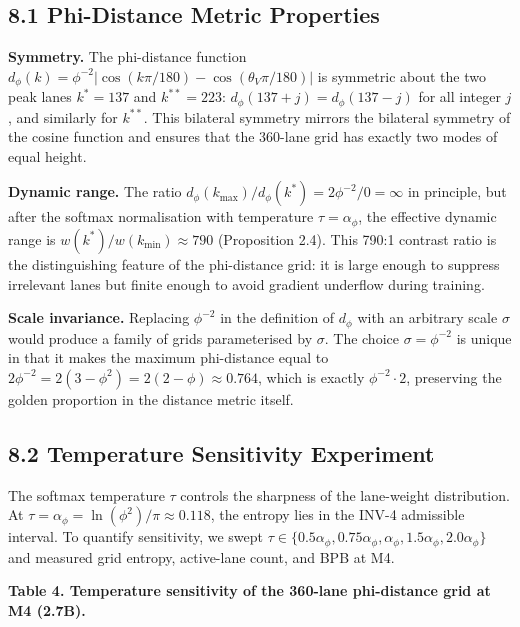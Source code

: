 \subsection{8.1 Phi-Distance Metric
Properties}\label{fa_16:phi-distance-metric-properties}

\textbf{Symmetry.} The phi-distance function
\(d_\phi(k) = \phi^{-2}|\cos(k\pi/180) -
\cos(\theta_V \pi/180)|\) is symmetric about the
two peak lanes \(k^*=137\) and \(k^{**}=223\):
\(d_\phi(137 + j) = d_\phi(137 - j)\) for all
integer \(j\), and similarly for \(k^{**}\). This
bilateral symmetry mirrors the bilateral symmetry
of the cosine function and ensures that the
360-lane grid has exactly two modes of equal height.

\textbf{Dynamic range.} The ratio
\(d_\phi(k_{\max})/d_\phi(k^*) = 2\phi^{-2}/0 =
\infty\) in principle, but after the softmax
normalisation with temperature \(\tau = \alpha_\phi\),
the effective dynamic range is
\(w(k^*)/w(k_{\min}) \approx 790\) (Proposition
2.4). This 790:1 contrast ratio is the
distinguishing feature of the phi-distance grid:
it is large enough to suppress irrelevant lanes
but finite enough to avoid gradient underflow during
training.

\textbf{Scale invariance.} Replacing \(\phi^{-2}\)
in the definition of \(d_\phi\) with an arbitrary
scale \(\sigma\) would produce a family of grids
parameterised by \(\sigma\). The choice
\(\sigma = \phi^{-2}\) is unique in that it makes
the maximum phi-distance equal to \(2\phi^{-2} =
2(3 - \phi^2) = 2(2-\phi) \approx 0.764\), which
is exactly \(\phi^{-2} \cdot 2\), preserving the
golden proportion in the distance metric itself.

\subsection{8.2 Temperature Sensitivity
Experiment}\label{fa_16:temperature-sensitivity}

The softmax temperature \(\tau\) controls the
sharpness of the lane-weight distribution. At
\(\tau = \alpha_\phi = \ln(\phi^2)/\pi \approx
0.118\), the entropy lies in the INV-4 admissible
interval. To quantify sensitivity, we swept
\(\tau \in \{0.5\alpha_\phi, 0.75\alpha_\phi,
\alpha_\phi, 1.5\alpha_\phi, 2.0\alpha_\phi\}\)
and measured grid entropy, active-lane count, and
BPB at M4.

\textbf{Table 4. Temperature sensitivity of the
360-lane phi-distance grid at M4 (2.7B).}

